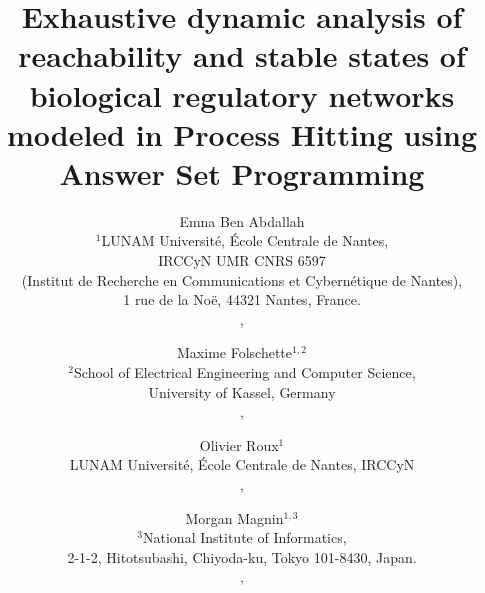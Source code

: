 \documentclass{tlp}
\begin{document}
%

\long{}


\title[Exhaustive analysis of biological regulatory networks using ASP]{Exhaustive dynamic analysis of reachability and stable states
of biological regulatory networks modeled in Process Hitting
using Answer Set Programming}


\author[E. Ben Abdallah, M. Folschette, O. Roux, M. Magnin]
{Emna Ben Abdallah\\
$^1$LUNAM Université, \'Ecole Centrale de Nantes, \\
 IRCCyN UMR CNRS 6597\\ (Institut de Recherche en Communications et Cybern\'etique de Nantes),\\
  1 rue de la Noë, 44321 Nantes, France.\\
,\\
\and Maxime Folschette$^{1,2}$\\
$^2$School of Electrical Engineering and Computer Science,\\
University of Kassel, Germany \\
,\\
\and
Olivier Roux$^1$ \\
LUNAM Université, \'Ecole Centrale de Nantes, IRCCyN \\
,\\
\and Morgan Magnin$^{1,3}$ \\
$^3$National Institute of Informatics, \\
2-1-2, Hitotsubashi, Chiyoda-ku, Tokyo 101-8430, Japan.\\
,\\
}
\pagerange{\pageref{firstpage}--\pageref{lastpage}}
\setcounter{page}{1}

\maketitle
\end{document}
